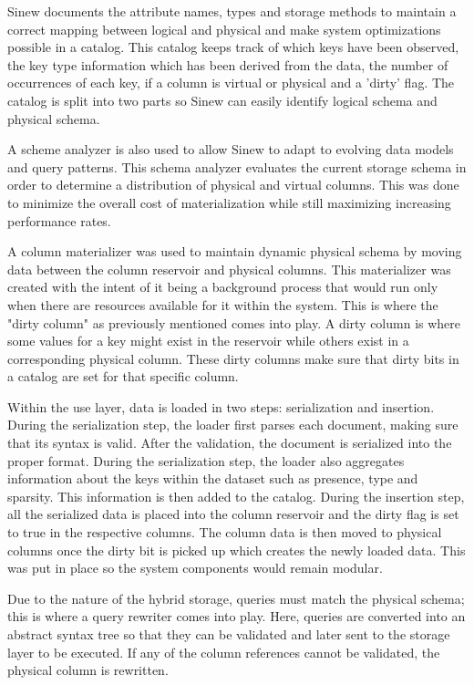 \documentclass[sigconf]{acmart}
\begin{document}
   Sinew documents the attribute names, types and storage methods to maintain a correct mapping between logical and physical and make system optimizations possible in a catalog. This catalog keeps track of which keys have been observed, the key type information which has been derived from the data, the number of occurrences of each key, if a column is virtual or physical and a 'dirty' flag. The catalog is split into two parts so Sinew can easily identify logical schema and physical schema.

   A scheme analyzer is also used to allow Sinew to adapt to evolving data models and query patterns. This schema analyzer evaluates the current storage schema in order to determine a distribution of physical and virtual columns. This was done to minimize the overall cost of materialization while still maximizing increasing performance rates.

   A column materializer was used to maintain dynamic physical schema by moving data between the column reservoir and physical columns. This materializer was created with the intent of it being a background process that would run only when there are resources available for it within the system. This is where the "dirty column" as previously mentioned comes into play. A dirty column is where some values for a key might exist in the reservoir while others exist in a corresponding physical column. These dirty columns make sure that dirty bits in a catalog are set for that specific column.

   Within the use layer, data is loaded in two steps: serialization and insertion. During the serialization step, the loader first parses each document, making sure that its syntax is valid. After the validation, the document is serialized into the proper format. During the serialization step, the loader also aggregates information about the keys within the dataset such as presence, type and sparsity. This information is then added to the catalog. During the insertion step, all the serialized data is placed into the column reservoir and the dirty flag is set to true in the respective columns. The column data is then moved to physical columns once the dirty bit is picked up which creates the newly loaded data. This was put in place so the system components would remain modular.

   Due to the nature of the hybrid storage, queries must match the physical schema; this is where a query rewriter comes into play. Here, queries are converted into an abstract syntax tree so that they can be validated and later sent to the storage layer to be executed. If any of the column references cannot be validated, the physical column is rewritten.
\end{document}
